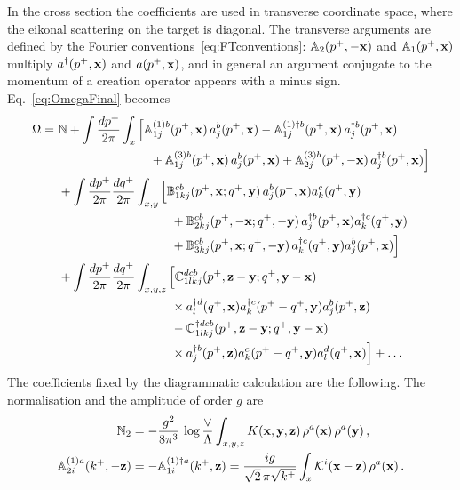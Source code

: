 In the cross section the coefficients are used in transverse coordinate space, where the eikonal scattering on the target is diagonal. The transverse arguments are defined by the Fourier conventions~\eqref{eq:FTconventions}: $\mathbb{A}_2(p^+,-\mathbf{x})$ and $\mathbb{A}_1(p^+,\mathbf{x})$ multiply $a^\dagger(p^+,\mathbf{x})$ and $a(p^+,\mathbf{x})$, and in general an argument conjugate to the momentum of a creation operator appears with a minus sign. Eq.~\eqref{eq:OmegaFinal} becomes
\begin{align}\label{eq:OmegaX}
\Omega = \ &\mf N
+\int\frac{dp^+}{2\pi}\int_x\Big[\mf A^{(1)b}_{1j}(p^+,\v x)\,a^b_j(p^+,\v x)-\mf A^{(1)\dagger b}_{1j}(p^+,\v x)\,a^{\dagger b}_j(p^+,\v x)
\notag\\&\hspace{2.6cm}
+\mf A^{(3)b}_{1j}(p^+,\v x)\,a^b_j(p^+,\v x)+\mf A^{(3)b}_{2j}(p^+,-\v x)\,a^{\dagger b}_j(p^+,\v x)\Big]
\notag\\&
+\int\frac{dp^+}{2\pi}\frac{dq^+}{2\pi}\int_{x,y}\Big[\mf B^{cb}_{1kj}(p^+,\v x;q^+,\v y)\,a^b_j(p^+,\v x)a^c_k(q^+,\v y)
\notag\\&\hspace{3.2cm}
+\mf B^{cb}_{2kj}(p^+,-\v x;q^+,-\v y)\,a^{\dagger b}_j(p^+,\v x)a^{\dagger c}_k(q^+,\v y)
\notag\\&\hspace{3.2cm}
+\mf B^{cb}_{3kj}(p^+,\v x;q^+,-\v y)\,a^{\dagger c}_k(q^+,\v y)a^b_j(p^+,\v x)\Big]
\notag\\&
+\int\frac{dp^+}{2\pi}\frac{dq^+}{2\pi}\int_{x,y,z}\Big[\mf C^{dcb}_{1lkj}(p^+,\v z-\v y;q^+,\v y-\v x)
\notag\\&\hspace{3.2cm}\times a^{\dagger d}_l(q^+,\v x)a^{\dagger c}_k(p^+-q^+,\v y)a^b_j(p^+,\v z)
\notag\\&\hspace{3.2cm}
-\mf C^{\dagger dcb}_{1lkj}(p^+,\v z-\v y;q^+,\v y-\v x)
\notag\\&\hspace{3.2cm}\times a^{\dagger b}_j(p^+,\v z)a^c_k(p^+-q^+,\v y)a^d_l(q^+,\v x)\Big]+\dots
\end{align}
The coefficients fixed by the diagrammatic calculation are the following. The normalisation and the amplitude of order $g$ are
\begin{align}
\mathbb{N}_2&=-\frac{g^2}{8\pi^3}\,\log\frac{\vee}{\Lambda}\int_{x,y,z}K(\mathbf{x},\mathbf{y},\mathbf{z})\,\rho^a(\mathbf{x})\,\rho^a(\mathbf{y})\,,\label{eq:N2X}\\
\mathbb{A}^{(1)a}_{2i}(k^+,-\mathbf{z})&=-\mathbb{A}^{(1)\dagger a}_{1i}(k^+,\mathbf{z})=\frac{ig}{\sqrt2\,\pi\sqrt{k^+}}\int_x\mathcal{K}^i(\mathbf{x}-\mathbf{z})\,\rho^a(\mathbf{x})\,.\label{eq:A1X}
\end{align}

